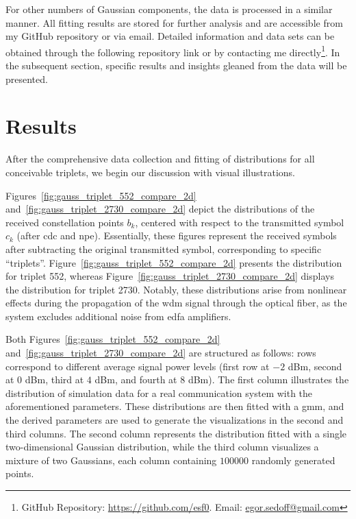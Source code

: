 For other numbers of Gaussian components, the data is processed in a similar manner. All fitting results are stored for further analysis and are accessible from my GitHub repository or via email. Detailed information and data sets can be obtained through the following repository link or by contacting me directly\footnote{GitHub Repository: \href{https://github.com/esf0}{https://github.com/esf0}. Email: \href{mailto:egor.sedoff@gmail.com}{egor.sedoff@gmail.com}}. In the subsequent section, specific results and insights gleaned from the data will be presented.


\section{Results}





After the comprehensive data collection and fitting of distributions for all conceivable triplets, we begin our discussion with visual illustrations.

Figures~\ref{fig:gauss_triplet_552_compare_2d} and~\ref{fig:gauss_triplet_2730_compare_2d} depict the distributions of the received constellation points \( b_k \), centered with respect to the transmitted symbol \( c_k \) (after \gls{cdc} and \gls{npe}). Essentially, these figures represent the received symbols after subtracting the original transmitted symbol, corresponding to specific ``triplets''. Figure~\ref{fig:gauss_triplet_552_compare_2d} presents the distribution for triplet 552, whereas Figure~\ref{fig:gauss_triplet_2730_compare_2d} displays the distribution for triplet 2730. Notably, these distributions arise from nonlinear effects during the propagation of the \acrshort{wdm} signal through the optical fiber, as the system excludes additional noise from \acrshort{edfa} amplifiers.

Both Figures~\ref{fig:gauss_triplet_552_compare_2d} and~\ref{fig:gauss_triplet_2730_compare_2d} are structured as follows: rows correspond to different average signal power levels (first row at \(-2\) dBm, second at \(0\) dBm, third at \(4\) dBm, and fourth at \(8\) dBm). The first column illustrates the distribution of simulation data for a real communication system with the aforementioned parameters. These distributions are then fitted with a \gls{gmm}, and the derived parameters are used to generate the visualizations in the second and third columns. The second column represents the distribution fitted with a single two-dimensional Gaussian distribution, while the third column visualizes a mixture of two Gaussians, each column containing \(100000\) randomly generated points.

